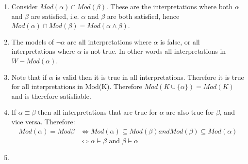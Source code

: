 \begin{enumerate}
    \item Consider $Mod(\alpha) \cap Mod(\beta)$. These are the interpretations where both $\alpha$ and $\beta$ are satisfied, i.e. $\alpha$ and $\beta$ are both satisfied, hence $ Mod(\alpha) \cap Mod(\beta) = Mod(\alpha \wedge \beta)$.

    \item The models of $\neg \alpha$ are all interpretations where $\alpha$ is false, or all interpretations where $\alpha$ is not true. In other words all interpretations in $W - Mod(\alpha)$.

    \item Note that if $\alpha$ is valid then it is true in all interpretations. Therefore it is true for all interpretations in Mod(K). Therefore $Mod(K \cup \{\alpha\}) = Mod(K)$ and is therefore satisfiable.

    \item If $\alpha \equiv \beta$ then all interpretations that are true for $\alpha$ are also true for $\beta$, and vice versa. Therefore:
    \begin{align*}
        Mod(\alpha) = Mod{\beta} &\Leftrightarrow Mod(\alpha) \subseteq Mod(\beta) and Mod(\beta) \subseteq Mod(\alpha)\\
        &\Leftrightarrow \alpha \models \beta \text{ and } \beta \models \alpha
    \end{align*}


    \item
\end{enumerate}